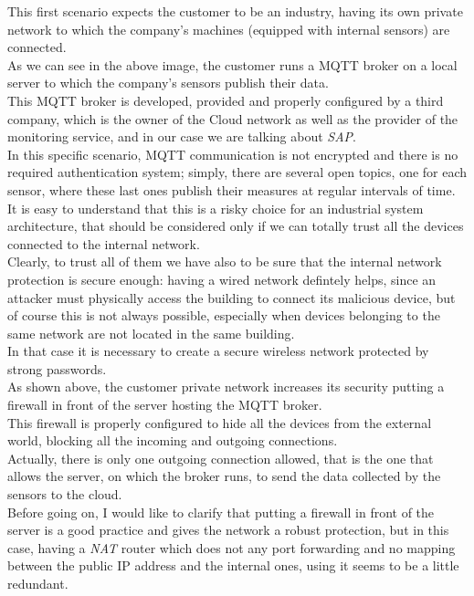 \documentclass[12pt]{report}
\begin{document}
{This first scenario expects the customer to be an industry, having its own private network to which the company's machines (equipped with internal sensors) are connected.\\
As we can see in the above image, the customer runs a MQTT broker on a local server to which the company's sensors publish their data.\\

This MQTT broker is developed, provided and properly configured by a third company, which is the owner of the Cloud network as well as the provider of the monitoring service, and in our case we are talking about \emph{SAP}.\\
In this specific scenario, MQTT communication is not encrypted and there is no required authentication system; simply, there are several open topics, one for each sensor, where these last ones publish their measures at regular intervals of time.\\
It is easy to understand that this is a risky choice for an industrial system architecture, that should be considered only if we can totally trust all the devices connected to the internal network.\\
Clearly, to trust all of them we have also to be sure that the internal network protection is secure enough: having a wired network defintely helps, since an attacker must physically access the building to connect its malicious device, but of course this is not always possible, especially when devices belonging to the same network are not located in the same building.\\
In that case it is necessary to create a secure wireless network protected by strong passwords.\\

As shown above, the customer private network increases its security putting a firewall in front of the server hosting the MQTT broker.\\
This firewall is properly configured to hide all the devices from the external world, blocking all the incoming and outgoing connections.\\
Actually, there is only one outgoing connection allowed, that is the one that allows the server, on which the broker runs, to send the data collected by the sensors to the cloud.\\
Before going on, I would like to clarify that putting a firewall in front of the server is a good practice and gives the network a robust protection, but in this case, having a \emph{NAT} router which does not any port forwarding and no mapping between the public IP address and the internal ones, using it seems to be a little redundant.\\

}
\end{document}
